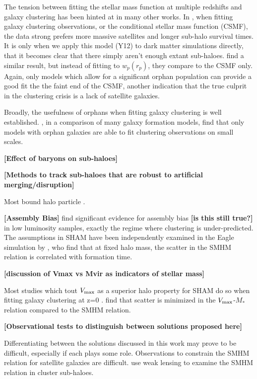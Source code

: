 \documentclass[a4paper,fleqn,usenatbib]{mnras}
\begin{document}
The tension between fitting the stellar mass function at multiple redshifts and galaxy clustering has been hinted at in many other works.  In \cite{Yang:2012ew}, when fitting galaxy clustering observations, or the conditional stellar mass function (CSMF), the data strong prefers more massive satellites and longer sub-halo survival times.  It is only when we apply this model (Y12) to dark matter simulations directly, that it becomes clear that there simply aren't enough extant sub-haloes.  \citep{Lim:2016ul} find a similar result, but instead of fitting to $w_p(r_p)$, they compare to the CSMF only.  Again, only models which allow for a significant orphan population can provide a good fit the the faint end of the CSMF, another indication that the true culprit in the clustering crisis is a lack of satellite galaxies.  

Broadly, the usefulness of orphans when fitting galaxy clustering is well established.  \cite{Pujol:2017ua}, in a comparison of many galaxy formation models, find that only models with orphan galaxies are able to fit clustering observations on small scales.

{\bf [Effect of baryons on sub-haloes]}    

{\bf [Methods to track sub-haloes that are robust to artificial merging/disruption]}  

Most bound halo particle \citep{Hong:2016hv}.

{\bf [Assembly Bias]}
\citep{Zentner:2016tz} find significant evidence for assembly bias {\bf [is this still true?]} in low luminosity samples, exactly the regime where clustering is under-predicted.   
The assumptions in SHAM have been independently examined in the Eagle simulation by \cite{Matthee:2016vm}, who find that at fixed halo mass, the scatter in the SMHM relation is correlated with formation time.

{\bf [discussion of Vmax vs Mvir as indicators of stellar mass]}

Most studies which tout $V_{\rm max}$ as a superior halo property for SHAM do so when fitting galaxy clustering at z=0 \citep{Reddick:2013gi, Lehmann:2015vi}.  \cite{Matthee:2016vm} find that scatter is minimized in the $V_{\rm max}$-$M_*$ relation compared to the SMHM relation.    

{\bf [Observational tests to distinguish between solutions proposed here]}

Differentiating between the solutions discussed in this work may prove to be difficult, especially if each plays some role.  Observations to constrain the SMHM relation for satellite galaxies are difficult.  \cite{Niemiec:2017ul} use weak lensing to examine the SMHM relation in cluster sub-haloes.
\end{document}
